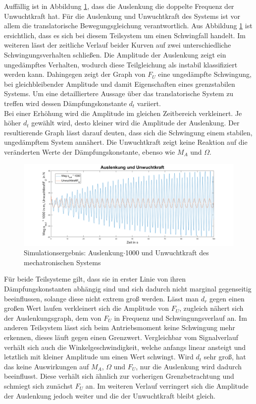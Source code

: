 Auffällig ist in Abbildung \ref{fig:StreckeundUnwuchtkraft}, dass die Auslenkung die doppelte Frequenz der Unwuchtkraft hat. Für die Auslenkung und Unwuchtkraft des Systems ist vor allem die translatorische Bewegungsgleichung verantwortlich. Aus Abbildung \ref{fig:StreckeundUnwuchtkraft} ist ersichtlich, dass es sich bei diesem Teilsystem um einen Schwingfall handelt. Im weiteren lässt der zeitliche Verlauf beider Kurven auf zwei unterschiedliche Schwingungsverhalten schließen. Die Amplitude der Auslenkung zeigt ein ungedämpftes Verhalten, wodurch diese Teilgleichung als instabil klassifiziert werden kann. Dahingegen zeigt der Graph von $F_U$ eine ungedämpfte Schwingung, bei gleichbleibender Amplitude und damit Eigenschaften eines grenzstabilen Systems. Um eine detailliertere Aussage über das translatorische System zu treffen wird dessen Dämpfungskonstante $d_t$ variiert. \\
Bei einer Erhöhung wird die Amplitude im gleichen Zeitbereich verkleinert. Je höher $d_t$ gewählt wird, desto kleiner wird die Amplitude der Auslenkung. Der resultierende Graph lässt darauf deuten, dass sich die Schwingung einem stabilen, ungedämpftem System annähert. Die Unwuchtkraft zeigt keine Reaktion auf die veränderten Werte der Dämpfungskonstante, ebenso wie $M_A$ und $\Omega$. \\

\newpage

\begin{figure}[hbt]
	\centering
	\includegraphics[width=1\linewidth]{Images/StreckeundUnwuchtkraft}
	\caption{Simulationsergebnis: Auslenkung$\cdot$1000 und Unwuchtkraft des mechatronischen Systems}
	\label{fig:StreckeundUnwuchtkraft}
\end{figure}

Für beide Teilsysteme gilt, dass sie in erster Linie von ihren Dämpfungskonstanten abhängig sind und sich dadurch nicht marginal gegenseitig beeinflussen, solange diese nicht extrem groß werden. Lässt man $d_r$ gegen einen großen Wert laufen verkleinert sich die Amplitude von $F_U$, zugleich nähert sich der Auslenkungsgraph, dem von $F_U$ in Frequenz und Schwingungsverlauf an. Im anderen Teilsystem lässt sich beim Antriebsmoment keine Schwingung mehr erkennen, dieses läuft gegen einen Grenzwert. Vergleichbar vom Signalverlauf verhält sich auch die Winkelgeschwindigkeit, welche anfangs linear ansteigt und letztlich mit kleiner Amplitude um einen Wert schwingt. Wird $d_t$ sehr groß, hat das keine Auswirkungen auf $M_A$, $\Omega$ und $F_U$, nur die Auslenkung wird dadurch beeinflusst. Diese verhält sich ähnlich zur vorherigen Grenzbetrachtung und schmiegt sich zunächst $F_U$ an. Im weiteren Verlauf verringert sich die Amplitude der Auslenkung jedoch weiter und die der Unwuchtkraft bleibt gleich.